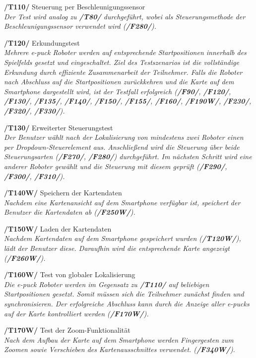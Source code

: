 \documentclass[10pt,a4paper]{article}
\begin{document}
\begin{list}{}{\leftmargin=1cm}
				\item[\textbf{/T110/}] Steuerung per Beschleunigungssensor
					\\ \textsl{Der Test wird analog zu \textbf{/T80/} durchgeführt, wobei als Steuerungsmethode der Beschleunigungssensor
						verwendet wird (\textbf{/F280/}).}
				\item[\textbf{/T120/}] Erkundungstest
					\\ \textsl{Mehrere e-puck Roboter werden auf entsprechende Startpositionen innerhalb des Spielfelds gesetzt und
						eingeschaltet. Ziel des Testszenarios ist die vollständige Erkundung durch effiziente Zusammenarbeit der Teilnehmer.
						Falls die Roboter nach Abschluss auf die Startpositionen zurückkehren und die Karte auf dem Smartphone dargestellt
						wird, ist der Testfall erfolgreich (\textbf{/F90/}, \textbf{/F120/}, \textbf{/F130/}, \textbf{/F135/}, \textbf{/F140/},
						\textbf{/F150/}, \textbf{/F155/}, \textbf{/F160/}, \textbf{/F190W/}, \textbf{/F230/}, \textbf{/F320/}, \textbf{/F330/}).}
				\item[\textbf{/T130/}] Erweiterter Steuerungstest
					\\ \textsl{Der Benutzer wählt nach der Lokalisierung von mindestens zwei Roboter einen per Dropdown-Steuerelement aus.
						Anschließend wird die Steuerung über beide Steuerungsarten (\textbf{/F270/}, \textbf{/F280/}) durchgeführt. Im nächsten
						Schritt wird eine anderer Roboter gewählt und die Steuerung mit diesem geprüft (\textbf{/F290/}, \textbf{/F300/},
						\textbf{/F310/}).}
				\item[\textbf{/T140W/}] Speichern der Kartendaten
					\\ \textsl{Nachdem eine Kartenansicht auf dem Smartphone verfügbar ist, speichert der Benutzer die Kartendaten ab
						(\textbf{/F250W/}).}
				\item[\textbf{/T150W/}] Laden der Kartendaten
					\\ \textsl{Nachdem Kartendaten auf dem Smartphone gespeichert wurden (\textbf{/T120W/}), lädt der Benutzer diese.
						Daraufhin wird die entsprechende Karte angezeigt (\textbf{/F260W/}).}						
				\item[\textbf{/T160W/}] Test von globaler Lokalisierung
					\\ \textsl{Die e-puck Roboter werden im Gegensatz zu \textbf{/T110/} auf beliebigen Startpositionen gesetzt. Somit müssen
						sich die Teilnehmer zunächst finden und synchronisieren. Der erfolgreiche Abschluss kann durch die Anzeige aller e-pucks
						auf der Karte kontrolliert werden (\textbf{/F170W/}).}		
				\item[\textbf{/T170W/}] Test der Zoom-Funktionalität
					\\ \textsl{Nach dem Aufbau der Karte auf dem Smartphone werden Fingergesten zum Zoomen sowie Verschieben des
						Kartenausschnittes verwendet. (\textbf{/F340W/}).}																						
			\end{list} 
				
	\printglossary[style=altlist,title=Glossar]
						
\end{document}
